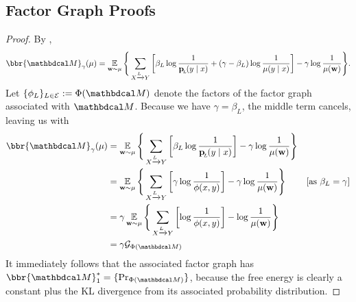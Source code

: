 \subsection{Factor Graph Proofs}
{}
\begin{proof}
	By ,
	\[ \bbr{\dg M}_\gamma(\mu)= \E_{\mat w \sim \mu} \Bigg\{   \sum_{ X \xrightarrow{\!\!L} Y  } \left[
		\beta_L \log \frac{1}{\bp(y\mid x)} + (\gamma
					- \beta_L ) \log \frac{1}{\mu(y \mid x)}
					\right] - \gamma \log \frac{1}{\mu(\mat w)}
			\Bigg\}.  \]
	Let $\{\phi_L\}_{L \in \Ed} := \Phi(\dg M)$ denote the
			factors of the factor graph associated with $\dg M$. 
	Because we have $\gamma  = \beta_L$, the middle term cancels, leaving us with
	\begin{align*}
	\bbr{\dg M}_\gamma(\mu) &= \E_{\mat w \sim \mu} \Bigg\{   \sum_{ X \xrightarrow{\!\!L} Y  } \left[
		\beta_L \log \frac{1}{\bp(y\mid x)} \right] - \gamma \log \frac{1}{\mu(\mat w)} \Bigg\} \\
		&= \E_{\mat w \sim \mu} \Bigg\{   \sum_{ X \xrightarrow{\!\!L} Y  } \left[
			\gamma \log \frac{1}{\phi(x,y)}  \right] - \gamma \log \frac{1}{\mu(\mat w)} \Bigg\} 
					&\text{[as $\beta_L = \gamma$]}\\
		&= \gamma \E_{\mat w \sim \mu} \Bigg\{   \sum_{ X \xrightarrow{\!\!L} Y  } \left[
			\log \frac{1}{\phi(x,y)}  \right] -\log \frac{1}{\mu(\mat w)} \Bigg\} \\
		&= \gamma \mathcal G_{\Phi(\dg M)}
	\end{align*}
	It immediately follows that the associated factor graph has $\bbr{\dg M}^*_1 = \{\Pr_{\Phi(\dg M)}\}$, because the free energy is clearly a constant plus the KL divergence from its associated probability distribution.
\end{proof}

{}

